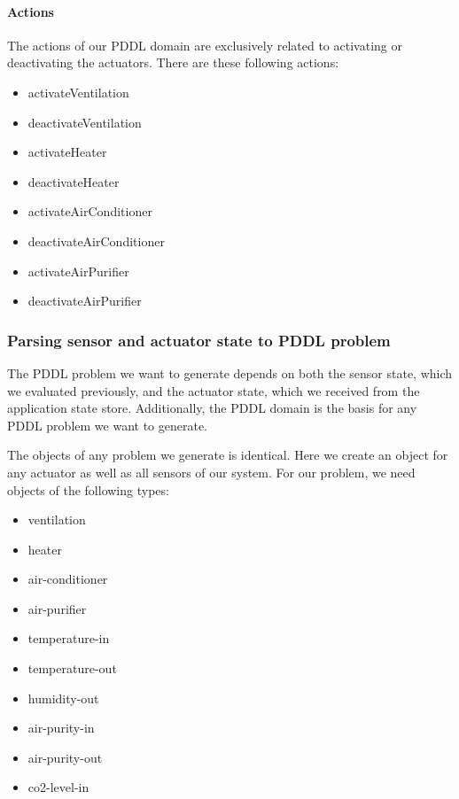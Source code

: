 \paragraph{Actions}
The actions of our PDDL domain are exclusively related to activating or deactivating the actuators. There are these following actions:
\begin{itemize}
    \item activateVentilation
    \item deactivateVentilation
    \item activateHeater
    \item deactivateHeater
    \item activateAirConditioner
    \item deactivateAirConditioner
    \item activateAirPurifier
    \item deactivateAirPurifier
\end{itemize}

\subsubsection{Parsing sensor and actuator state to PDDL problem}
The PDDL problem we want to generate depends on both the sensor state, which we evaluated previously, and the actuator state, which we received from the application state store. Additionally, the PDDL domain is the basis for any PDDL problem we want to generate.

The objects of any problem we generate is identical. Here we create an object for any actuator as well as all sensors of our system. For our problem, we need objects of the following types:
\begin{itemize}
    \item ventilation
    \item heater
    \item air-conditioner
    \item air-purifier
    \item temperature-in
    \item temperature-out
    \item humidity-out
    \item air-purity-in
    \item air-purity-out
    \item co2-level-in
\end{itemize}

